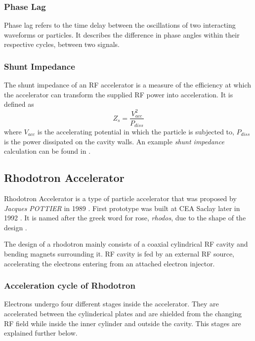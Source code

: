 \documentclass{article}
\begin{document}
\subsubsection{Phase Lag}
Phase lag refers to the time delay between the oscillations of two interacting waveforms or particles. 
It describes the difference in phase angles within their respective cycles, between two signals. 

\subsubsection{Shunt Impedance}
The shunt impedance of an RF accelerator is a measure of the efficiency 
at which the accelerator can transform the supplied RF power into acceleration.
It is defined as
\begin{equation} \label{eq:shunt}
    Z_s = \frac{V_{acc}^2}{P_{diss}}
\end{equation}
where $V_{acc}$ is the accelerating potential in which the particle is subjected to, 
$P_{diss}$ is the power dissipated on the cavity walls. 
An example \textit{shunt impedance} calculation can be found in .


\subsection{Rhodotron Accelerator} \label{sec:theory_rhodo}

Rhodotron Accelerator is a type of particle accelerator that was proposed by \textit{Jacques POTTIER} in 1989 \cite{rhodo_pottier}. 
First prototype was built at CEA Saclay later in 1992 \cite{rhodo_prototype}. It is named after the greek word for rose, \textit{rhodos}, due to the shape of the design \cite{rhodos}.

The design of a rhodotron mainly consists of a coaxial cylindrical RF cavity and bending magnets surrounding it. RF cavity is fed by an external RF source, accelerating the electrons entering from an attached electron injector.


\subsubsection{Acceleration cycle of Rhodotron}

Electrons undergo four different stages inside the accelerator. 
They are accelerated between the cylinderical plates and are shielded from the changing RF field while inside the inner cylinder and outside the cavity. 
This stages are explained further below.
\end{document}
